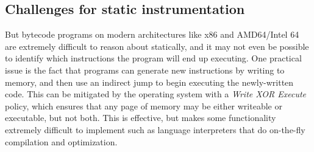 \documentclass[11pt,twoside]{scrartcl}
\begin{document}
\subsection{Challenges for static instrumentation}
But bytecode programs on modern architectures like x86 and AMD64/Intel 64 are extremely difficult to reason about statically, and it may not even be possible to identify which instructions the program will end up executing. One practical issue is the fact that programs can generate new instructions by writing to memory, and then use an indirect jump to begin executing the newly-written code. This can be mitigated by the operating system with a \emph{Write XOR Execute} policy, which ensures that any page of memory may be either writeable or executable, but not both. This is effective, but makes some functionality extremely difficult to implement such as language interpreters that do on-the-fly compilation and optimization.
\end{document}
